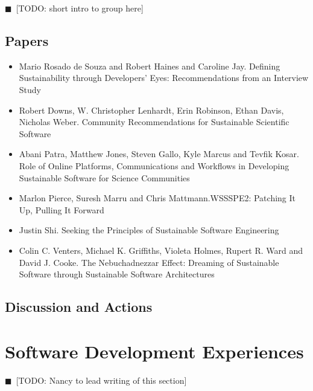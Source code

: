 \documentclass[11pt, oneside]{amsart}
\newcommand{\todo}[1]{{\color{blue}$\blacksquare$~\textsf{[TODO: #1]}}}
\begin{document}
\todo{short intro to group here}

\subsection{Papers}
\begin{itemize}
\item Mario {Rosado de Souza} and Robert Haines and Caroline Jay. Defining
Sustainability through Developers' Eyes: Recommendations from an Interview
Study~\cite{wssspe2_rosada_de_souza}

\item Robert Downs, W. Christopher Lenhardt, Erin Robinson, Ethan Davis,
Nicholas Weber. Community Recommendations for Sustainable Scientific
Software~\cite{wssspe2_downs}

\item Abani Patra, Matthew Jones, Steven Gallo, Kyle Marcus and Tevfik Kosar.
Role of Online Platforms, Communications and Workflows in Developing Sustainable
Software for Science Communities~\cite{wssspe2_patra}

\item Marlon Pierce, Suresh Marru and Chris Mattmann.{WSSSPE2}: Patching It Up,
Pulling It Forward~\cite{wssspe2_pierce}

\item Justin Shi. Seeking the Principles of Sustainable Software
Engineering~\cite{wssspe2_shi}

\item Colin C. Venters, Michael K. Griffiths, Violeta Holmes, Rupert R. Ward and
David J. Cooke. The Nebuchadnezzar Effect: Dreaming of Sustainable Software
through Sustainable Software Architectures~\cite{wssspe2_venters}
\end{itemize}

\subsection{Discussion and Actions}

\section{Software Development Experiences}
\todo{Nancy to lead writing of this section}
\end{document}
